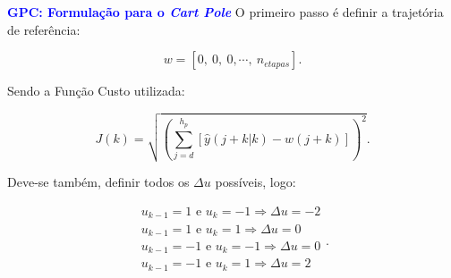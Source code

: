 \documentclass[aspectratio=169]{beamer}
\begin{document}
\begin{frame}{\textcolor{blue}{\textbf{GPC: Formulação para o \textit{Cart Pole}}}}
\vspace{-.5cm}
\justifying O primeiro passo é definir a trajetória de referência:

\begin{equation}
    w = [0,\:0,\:0, \cdots,\:n_{etapas}].
    \label{eq:traref}
\end{equation}

\justifying Sendo a Função Custo utilizada:

\begin{equation}
    J(k) =\sqrt{(\sum_{j=d}^{h_p} [\hat{y}(j+k|k) - w(j+k)])^2}.
    \label{eq:FO}
\end{equation}

\justifying Deve-se também, definir todos os $\Delta u$ possíveis, logo:

\begin{equation}
    \begin{matrix}
        u_{k-1} = 1 \text{ e } u_{k} = -1 \Rightarrow \Delta u = -2 \\
        u_{k-1} = 1 \text{ e } u_{k} = 1 \Rightarrow \Delta u = 0\\
        u_{k-1} = -1 \text{ e } u_{k} = -1 \Rightarrow \Delta u = 0\\
        u_{k-1} = -1 \text{ e } u_{k} = 1 \Rightarrow \Delta u = 2 \\
    \end{matrix}.
\end{equation}

\end{frame}

\end{document}
